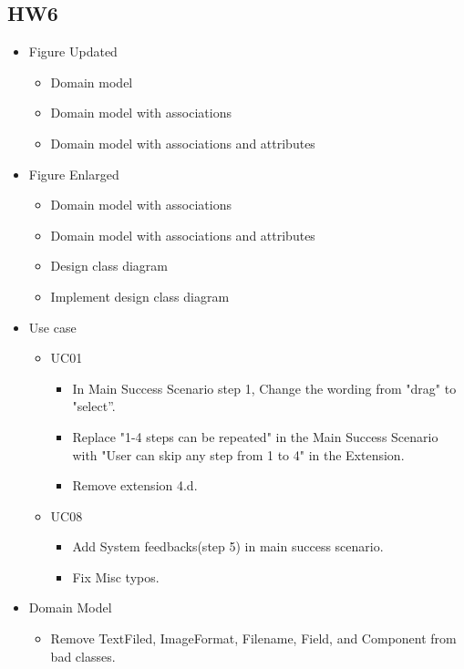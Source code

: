\documentclass[12pt]{article}
\begin{document}
    \subsection{HW6}
    \begin{itemize}
        \item Figure Updated
        \begin{itemize}
            \item Domain model
            \item Domain model with associations
            \item Domain model with associations and attributes
        \end{itemize}
        \item  Figure Enlarged
        \begin{itemize}
            \item Domain model with associations
            \item Domain model with associations and attributes
            \item Design class diagram
            \item Implement design class diagram
        \end{itemize}
        \item Use case
        \begin{itemize}
            \item UC01
            \begin{itemize}
                \item In Main Success Scenario step 1, Change the wording from "drag" to "select''.
                \item  Replace  "1-4 steps can be repeated" in the Main Success Scenario with
                "User can skip any step from 1 to 4" in the Extension.
                \item Remove extension 4.d.
            \end{itemize}
            \item UC08
            \begin{itemize}
                \item Add System feedbacks(step 5) in main success scenario.
                \item Fix Misc typos.
            \end{itemize}
        \end{itemize}
        \item Domain Model
        \begin{itemize}
            \item Remove TextFiled, ImageFormat, Filename, Field, and Component from bad classes.
        \end{itemize}
    \end{itemize}
\end{document}
